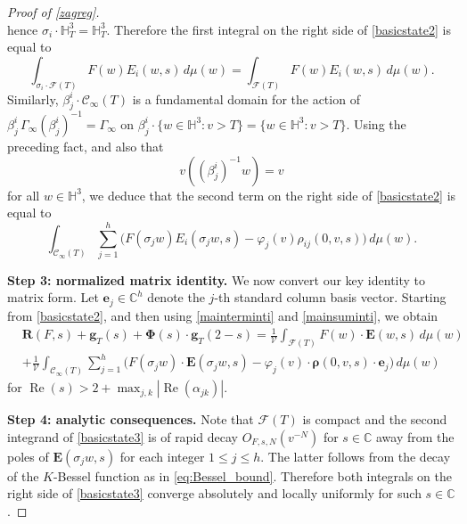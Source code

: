 \documentclass[12pt,reqno]{amsart}
\numberwithin{equation}{section}
\renewcommand{\Re}{\operatorname{Re}}
\newcommand{\C}{\mathbb{C}}
\begin{document}
\begin{proof}[Proof of \cref{zagreg}]
\begin{equation*}
\end{equation*}
hence $\sigma_i \cdot \mathbb{H}^3_T = \mathbb{H}^3_T$. Therefore the first integral on the right side of \eqref{basicstate2} is equal to
\begin{equation}\label{mainterminti}
    \int_{\sigma_i \cdot \mathcal{F}(T)} F(w) E_{i}(w,s) \, d \mu(w) = \int_{\mathcal{F}(T)} F(w) E_{i}(w,s) \, d \mu(w).
\end{equation}
Similarly, $\beta_{j}^i \cdot \mathcal{C}_\infty(T)$ is a fundamental domain for the action of $\beta_{j}^i\, \Gamma_\infty (\beta_{j}^i)^{-1} = \Gamma_{\infty}$ on $\beta_{j}^i \cdot \{w \in \mathbb{H}^3 : v > T\} = \{w \in \mathbb{H}^3 : v > T\}$. Using the preceding fact, and also that
\begin{equation*}
v((\beta_{j}^i)^{-1} w)=v
\end{equation*}
for all $w \in \mathbb{H}^3$, we deduce that the second term on the right side of \eqref{basicstate2} is equal to
\begin{equation}\label{mainsuminti}
    \int_{\mathcal{C}_{\infty}(T)}  \sum_{j=1}^{h}
    \Big(F(\sigma_{j} w) E_{i}( \sigma_{j}  w, s)- \varphi_{j}(v) \rho_{i j}(0,v,s) \Big) \, d \mu(w).
\end{equation}


\medskip
\noindent\textbf{Step 3: normalized matrix identity.} We now convert our key identity to matrix form. 
Let $\boldsymbol{e}_j \in \mathbb C^h$ denote the $j$-th standard column basis vector.
Starting from \eqref{basicstate2}, and then using \eqref{mainterminti} and \eqref{mainsuminti}, we obtain 
\begin{align} \label{basicstate3}
    &\boldsymbol{R}(F,s) + \boldsymbol{g}_T(s) + \boldsymbol{\Phi}(s) \cdot \boldsymbol{g}_T(2-s) = \frac{1}{\mathcal{V}} \int_{\mathcal{F}(T) } F(w) \cdot \boldsymbol{E}(w,s) \, d \mu(w) \nonumber \\
    &+\frac{1}{\mathcal{V}}\int_{\mathcal{C}_{\infty}(T)} \sum_{j=1}^{h} \Big(F(\sigma_{j} w) \cdot \boldsymbol{E}(\sigma_{j}w,s) -\varphi_{j}(v) \cdot \boldsymbol{\rho}(0,v,s) \cdot \boldsymbol{e}_j  \Big) \, d \mu(w)
\end{align}
for $\Re(s)>2 + \max_{j,k} \left|\Re(\alpha_{jk})\right|$. 


\medskip
\noindent\textbf{Step 4: analytic consequences.} Note that $\mathcal{F}(T)$ is compact and the second integrand of \eqref{basicstate3} is of rapid decay $O_{F, s, N}(v^{-N})$ for $s \in \C$ away from the poles of $\boldsymbol{E}(\sigma_{j}w,s)$ for each integer $1 \leq j \leq h$. The latter follows from the decay of the $K$-Bessel function as in 
\eqref{eq:Bessel_bound}. Therefore both integrals on the right side of \eqref{basicstate3} converge absolutely and locally uniformly for such $s \in \C$.


\end{proof}
\end{document}
